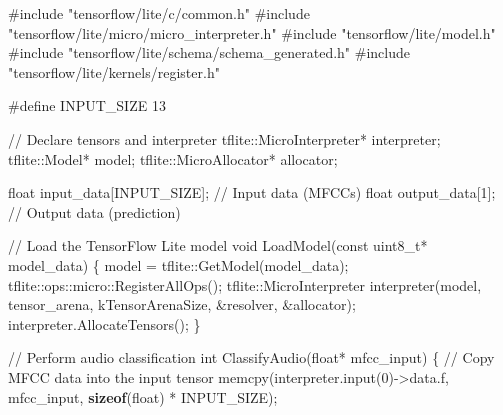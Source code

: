 \documentclass[
  9pt,
  letterpaper,
  abstract,
  titlepage]{scrbook}
\newenvironment{Shaded}{\begin{snugshade}}{\end{snugshade}}
\newcommand{\CommentTok}[1]{\textcolor[rgb]{0.37,0.37,0.37}{#1}}
\newcommand{\DataTypeTok}[1]{\textcolor[rgb]{0.68,0.00,0.00}{#1}}
\newcommand{\DecValTok}[1]{\textcolor[rgb]{0.68,0.00,0.00}{#1}}
\newcommand{\ImportTok}[1]{\textcolor[rgb]{0.00,0.46,0.62}{#1}}
\newcommand{\KeywordTok}[1]{\textcolor[rgb]{0.00,0.23,0.31}{\textbf{#1}}}
\newcommand{\NormalTok}[1]{\textcolor[rgb]{0.00,0.23,0.31}{#1}}
\newcommand{\OperatorTok}[1]{\textcolor[rgb]{0.37,0.37,0.37}{#1}}
\newcommand{\PreprocessorTok}[1]{\textcolor[rgb]{0.68,0.00,0.00}{#1}}
\begin{document}
\begin{Shaded}
\begin{Highlighting}[]
\PreprocessorTok{\#include }\ImportTok{"tensorflow/lite/c/common.h"}
\PreprocessorTok{\#include }\ImportTok{"tensorflow/lite/micro/micro\_interpreter.h"}
\PreprocessorTok{\#include }\ImportTok{"tensorflow/lite/model.h"}
\PreprocessorTok{\#include }\ImportTok{"tensorflow/lite/schema/schema\_generated.h"}
\PreprocessorTok{\#include }\ImportTok{"tensorflow/lite/kernels/register.h"}

\PreprocessorTok{\#define INPUT\_SIZE }\DecValTok{13}

\CommentTok{// Declare tensors and interpreter}
\NormalTok{tflite}\OperatorTok{::}\NormalTok{MicroInterpreter}\OperatorTok{*}\NormalTok{ interpreter}\OperatorTok{;}
\NormalTok{tflite}\OperatorTok{::}\NormalTok{Model}\OperatorTok{*}\NormalTok{ model}\OperatorTok{;}
\NormalTok{tflite}\OperatorTok{::}\NormalTok{MicroAllocator}\OperatorTok{*}\NormalTok{ allocator}\OperatorTok{;}

\DataTypeTok{float}\NormalTok{ input\_data}\OperatorTok{[}\NormalTok{INPUT\_SIZE}\OperatorTok{];}  \CommentTok{// Input data (MFCCs)}
\DataTypeTok{float}\NormalTok{ output\_data}\OperatorTok{[}\DecValTok{1}\OperatorTok{];}  \CommentTok{// Output data (prediction)}


\CommentTok{// Load the TensorFlow Lite model}
\DataTypeTok{void}\NormalTok{ LoadModel}\OperatorTok{(}\DataTypeTok{const} \DataTypeTok{uint8\_t}\OperatorTok{*}\NormalTok{ model\_data}\OperatorTok{)} \OperatorTok{\{}
\NormalTok{    model }\OperatorTok{=}\NormalTok{ tflite}\OperatorTok{::}\NormalTok{GetModel}\OperatorTok{(}\NormalTok{model\_data}\OperatorTok{);}
\NormalTok{    tflite}\OperatorTok{::}\NormalTok{ops}\OperatorTok{::}\NormalTok{micro}\OperatorTok{::}\NormalTok{RegisterAllOps}\OperatorTok{();}
\NormalTok{    tflite}\OperatorTok{::}\NormalTok{MicroInterpreter interpreter}\OperatorTok{(}\NormalTok{model}\OperatorTok{,}\NormalTok{ tensor\_arena}\OperatorTok{,}\NormalTok{ kTensorArenaSize}\OperatorTok{,} \OperatorTok{\&}\NormalTok{resolver}\OperatorTok{,} \OperatorTok{\&}\NormalTok{allocator}\OperatorTok{);}
\NormalTok{    interpreter}\OperatorTok{.}\NormalTok{AllocateTensors}\OperatorTok{();}
\OperatorTok{\}}

\CommentTok{// Perform audio classification}
\DataTypeTok{int}\NormalTok{ ClassifyAudio}\OperatorTok{(}\DataTypeTok{float}\OperatorTok{*}\NormalTok{ mfcc\_input}\OperatorTok{)} \OperatorTok{\{}
    \CommentTok{// Copy MFCC data into the input tensor}
\NormalTok{    memcpy}\OperatorTok{(}\NormalTok{interpreter}\OperatorTok{.}\NormalTok{input}\OperatorTok{(}\DecValTok{0}\OperatorTok{){-}\textgreater{}}\NormalTok{data}\OperatorTok{.}\NormalTok{f}\OperatorTok{,}\NormalTok{ mfcc\_input}\OperatorTok{,} \KeywordTok{sizeof}\OperatorTok{(}\DataTypeTok{float}\OperatorTok{)} \OperatorTok{*}\NormalTok{ INPUT\_SIZE}\OperatorTok{);}
    

\end{Highlighting}
\end{Shaded}
\end{document}
